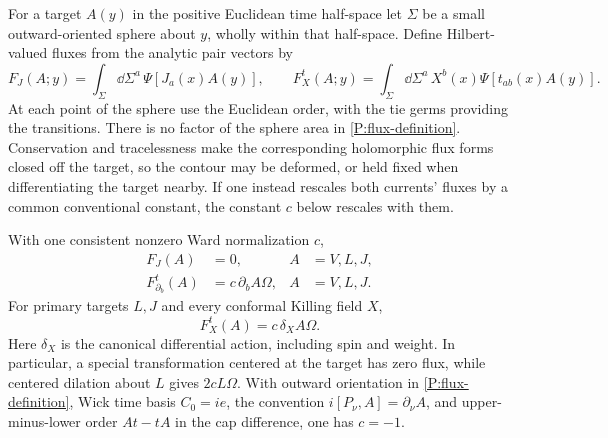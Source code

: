For a target $A(y)$ in the positive Euclidean time half-space let
$\Sigma$ be a small outward-oriented sphere about $y$, wholly within
that half-space.  Define Hilbert-valued fluxes from the analytic pair
vectors by
\begin{equation}
 F_J(A;y)=\int_\Sigma\dd\Sigma^a\,\Psi[J_a(x)A(y)],\qquad
 F_X^t(A;y)=\int_\Sigma\dd\Sigma^a\,X^b(x)\Psi[t_{ab}(x)A(y)].
 \label{P:flux-definition}
\end{equation}
At each point of the sphere use the Euclidean order, with the tie
germs providing the transitions.  There is no factor of the sphere
area in \eqref{P:flux-definition}.  Conservation and tracelessness
make the corresponding holomorphic flux forms closed off the target,
so the contour may be deformed, or held fixed when differentiating
the target nearby.  If one instead rescales both currents' fluxes by
a common conventional constant, the constant $c$ below rescales with
them.

\begin{proposition}
\label{P:flux-wards}
With one consistent nonzero Ward normalization $c$,
\begin{align}
 F_J(A)&=0,& A&=V,L,J,\label{P:J-flux}\\
 F^t_{\partial_b}(A)&=c\,\partial_b A\Omega,& A&=V,L,J.
 \label{P:translation-flux}
\end{align}
For primary targets $L,J$ and every conformal Killing field $X$,
\begin{equation}
 F_X^t(A)=c\,\delta_X A\Omega.
 \label{P:conformal-flux}
\end{equation}
Here $\delta_X$ is the canonical differential action, including spin
and weight.  In particular, a special transformation centered at the
target has zero flux, while centered dilation about $L$ gives
$2cL\Omega$.  With outward orientation in
\eqref{P:flux-definition}, Wick time basis $C_0=ie$, the convention
$i[P_\nu,A]=\partial_\nu A$, and upper-minus-lower order $At-tA$ in
the cap difference, one has $c=-1$.
\end{proposition}

